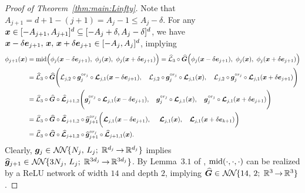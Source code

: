 \documentclass[nohyperref]{article}
\theoremstyle{plain}
\theoremstyle{definition}
\theoremstyle{remark}
\begin{document}
\begin{proof}[Proof of Theorem~\ref{thm:main:Linfty}]
Note that $A_{j+1}=d+1-(j+1)=A_j-1\le A_j-\delta$.
For any ${\bm{x}}\in [-A_{j+1},A_{j+1}]^d\subseteq [-A_j+\delta,A_j-\delta]^d$, we have ${\bm{x}}-\delta {\bm{e}}_{j+1},\, {\bm{x}},\, {\bm{x}}+\delta {\bm{e}}_{j+1}\in [-A_j,A_j]^d$, implying
\begin{equation*}
	\begin{split}
		\phi_{j+1}(\bmx)
		&=\middleValue\Big(\phi_j(\bmx-\delta  \bme_{j+1}), \ 
		\phi_j(\bmx), \   \phi_j(\bmx+\delta  \bme_{j+1})\Big)
		= \hatcalL_3\circ \bmhatG \Big(\phi_j(\bmx-\delta  \bme_{j+1}), \ 
		\phi_j(\bmx), \   \phi_j(\bmx+\delta  \bme_{j+1})\Big)\\
		&= \hatcalL_3\circ \bmhatG \Bigg(\calL_{j,2}\circ\bmg_j^{\circ r_j}\circ \bmcalL_{j,1}(\bmx-\delta  \bme_{j+1}), \quad 
		\calL_{j,2}\circ\bmg_j^{\circ r_j}\circ \bmcalL_{j,1}(\bmx), \quad   \calL_{j,2}\circ\bmg_j^{\circ r_j}\circ \bmcalL_{j,1}(\bmx+\delta  \bme_{j+1})\Bigg)\\
		&= \hatcalL_3\circ \bmhatG \circ \bmhatcalL_{j+1,2} \Bigg(\bmg_j^{\circ r_j}\circ \bmcalL_{j,1}(\bmx-\delta  \bme_{j+1}), \quad 
		\bmg_j^{\circ r_j}\circ \bmcalL_{j,1}(\bmx), \quad   \bmg_j^{\circ r_j}\circ \bmcalL_{j,1}(\bmx+\delta  \bme_{j+1})\Bigg)\\
		&= \hatcalL_3\circ \bmhatG \circ \bmhatcalL_{j+1,2}\circ \bmhatg_{j+1}^{\circ r_j} \bigg( \bmcalL_{j,1}(\bmx-\delta  \bme_{j+1}), \quad 
		\ \bmcalL_{j,1}(\bmx), \quad    \bmcalL_{j,1}(\bmx+\delta  \bme_{k+1})\bigg)\\
		&= \hatcalL_3\circ \bmhatG \circ \bmhatcalL_{j+1,2}\circ \bmhatg_{j+1}^{\circ r_j}\circ \bmhatcalL_{j+1,1}(\bmx).\\
	\end{split}
\end{equation*}
Clearly, $\bmg_j\in \nn{N_j}{L_j}{d_j}{d_j}$ implies $\bmhatg_{j+1}\in \nn{3N_j}{L_j}{3d_j}{3d_j}$.
By Lemma~$3.1$ of \cite{shijun:5}, ${\textnormal{mid}}(\cdot,\cdot,\cdot)$ can be realized by a ReLU network of width $14$ and depth $2$, implying 
$\bmhatG\in \nn{14}{2}{3}{3}$.  


\end{proof}
\end{document}
